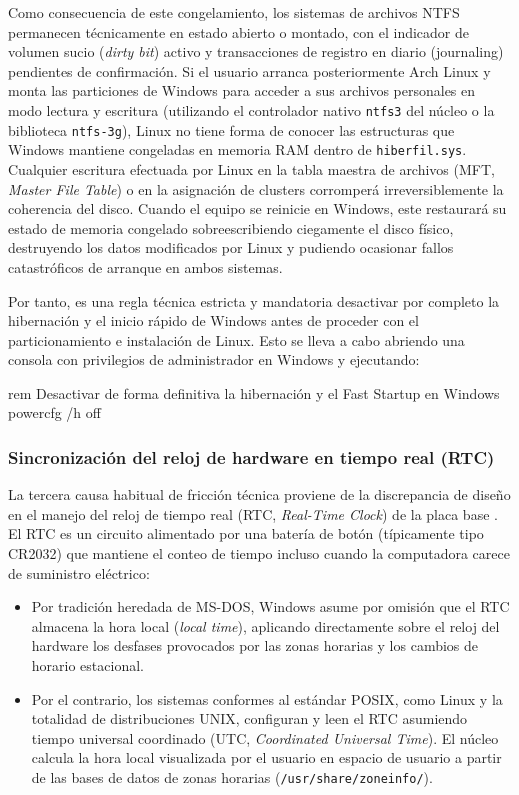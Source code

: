 \documentclass[12pt]{article}
\begin{document}
Como consecuencia de este congelamiento, los sistemas de archivos NTFS permanecen técnicamente en estado abierto o montado, con el indicador de volumen sucio (\textit{dirty bit}) activo y transacciones de registro en diario (journaling) pendientes de confirmación. Si el usuario arranca posteriormente Arch Linux y monta las particiones de Windows para acceder a sus archivos personales en modo lectura y escritura (utilizando el controlador nativo \texttt{ntfs3} del núcleo o la biblioteca \texttt{ntfs-3g}), Linux no tiene forma de conocer las estructuras que Windows mantiene congeladas en memoria RAM dentro de \texttt{hiberfil.sys}. Cualquier escritura efectuada por Linux en la tabla maestra de archivos (MFT, \textit{Master File Table}) o en la asignación de clusters corromperá irreversiblemente la coherencia del disco. Cuando el equipo se reinicie en Windows, este restaurará su estado de memoria congelado sobreescribiendo ciegamente el disco físico, destruyendo los datos modificados por Linux y pudiendo ocasionar fallos catastróficos de arranque en ambos sistemas.

Por tanto, es una regla técnica estricta y mandatoria desactivar por completo la hibernación y el inicio rápido de Windows antes de proceder con el particionamiento e instalación de Linux. Esto se lleva a cabo abriendo una consola con privilegios de administrador en Windows y ejecutando:
\begin{mdframed}[style=terminal]
\ttfamily\upshape\color{bashLetterColor}\footnotesize
rem Desactivar de forma definitiva la hibernación y el Fast Startup en Windows \\
powercfg /h off
\end{mdframed}

\subsubsection{Sincronización del reloj de hardware en tiempo real (RTC)}

La tercera causa habitual de fricción técnica proviene de la discrepancia de diseño en el manejo del reloj de tiempo real (RTC, \textit{Real-Time Clock}) de la placa base \parencite[\S 2.4.2, p.\ 76]{deitel2004operating}. El RTC es un circuito alimentado por una batería de botón (típicamente tipo CR2032) que mantiene el conteo de tiempo incluso cuando la computadora carece de suministro eléctrico:
\begin{itemize}[noitemsep, topsep=2pt]
    \item Por tradición heredada de MS-DOS, Windows asume por omisión que el RTC almacena la hora local (\textit{local time}), aplicando directamente sobre el reloj del hardware los desfases provocados por las zonas horarias y los cambios de horario estacional.
    \item Por el contrario, los sistemas conformes al estándar POSIX, como Linux y la totalidad de distribuciones UNIX, configuran y leen el RTC asumiendo tiempo universal coordinado (UTC, \textit{Coordinated Universal Time}). El núcleo calcula la hora local visualizada por el usuario en espacio de usuario a partir de las bases de datos de zonas horarias (\texttt{/usr/share/zoneinfo/}).
\end{itemize}
\end{document}
